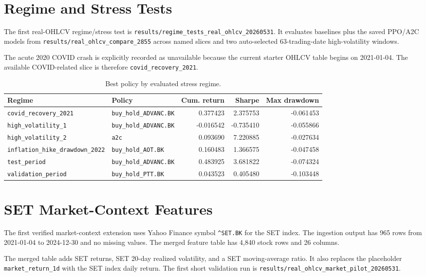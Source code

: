 \documentclass[11pt]{article}
\begin{document}
\section{Regime and Stress Tests}
The first real-OHLCV regime/stress test is \texttt{results/regime\_tests\_real\_ohlcv\_20260531}. It evaluates baselines plus the saved PPO/A2C models from \texttt{results/real\_ohlcv\_compare\_2855} across named slices and two auto-selected 63-trading-date high-volatility windows.

The acute 2020 COVID crash is explicitly recorded as unavailable because the current starter OHLCV table begins on 2021-01-04. The available COVID-related slice is therefore \texttt{covid\_recovery\_2021}.

\begin{table}[h]
\centering
\caption{Best policy by evaluated stress regime.}
\label{tab:regime}
\begin{tabular}{llrrr}
\toprule
Regime & Policy & Cum. return & Sharpe & Max drawdown \\
\midrule
\texttt{covid\_recovery\_2021} & \texttt{buy\_hold\_ADVANC.BK} & 0.377423 & 2.375753 & -0.061453 \\
\texttt{high\_volatility\_1} & \texttt{buy\_hold\_ADVANC.BK} & -0.016542 & -0.735410 & -0.055866 \\
\texttt{high\_volatility\_2} & \texttt{a2c} & 0.093690 & 7.220885 & -0.027634 \\
\texttt{inflation\_hike\_drawdown\_2022} & \texttt{buy\_hold\_AOT.BK} & 0.160483 & 1.366575 & -0.047458 \\
\texttt{test\_period} & \texttt{buy\_hold\_ADVANC.BK} & 0.483925 & 3.681822 & -0.074324 \\
\texttt{validation\_period} & \texttt{buy\_hold\_PTT.BK} & 0.043523 & 0.405480 & -0.103448 \\
\bottomrule
\end{tabular}
\end{table}

\section{SET Market-Context Features}
The first verified market-context extension uses Yahoo Finance symbol \texttt{\string^SET.BK} for the SET index. The ingestion output has 965 rows from 2021-01-04 to 2024-12-30 and no missing values. The merged feature table has 4,840 stock rows and 26 columns.

The merged table adds SET returns, SET 20-day realized volatility, and a SET moving-average ratio. It also replaces the placeholder \texttt{market\_return\_1d} with the SET index daily return. The first short validation run is \texttt{results/real\_ohlcv\_market\_pilot\_20260531}.
\end{document}
